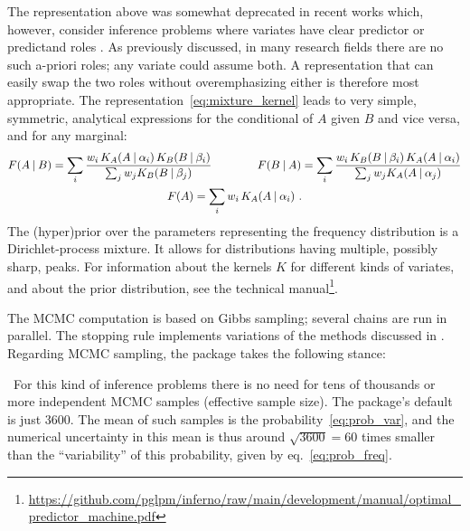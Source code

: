 The representation above was somewhat deprecated in recent works which, however, consider inference problems where variates have clear predictor or predictand roles \citep[e.g.][]{wadeetal2014,wadeetal2014b}. As previously discussed, in many research fields there are no such a-priori roles; any variate could assume both. A representation that can easily swap the two roles  without overemphasizing either is therefore most appropriate. The representation~\eqref{eq:mixture_kernel} leads to very simple, symmetric, analytical expressions for the conditional of $A$ given $B$ and vice versa, and for any marginal:
\begin{equation*}
  \begin{gathered}
    \yF(A \| B) = \sum_{i}
    \frac{w_{i}\, K_{A}(A \| \alpha_{i})\, K_{B}(B \| \beta_{i})}{\sum_{j} w_{j}K_{B}(B \| \beta_{j})}
\qquad\qquad    \yF(B \| A) = \sum_{i}
    \frac{w_{i}\, K_{B}(B \| \beta_{i})\, K_{A}(A \| \alpha_{i})}{\sum_{j} w_{j}K_{A}(A \| \alpha_{j})}
    \\
    \yF(A) = \sum_{i}
    w_{i}\, K_{A}(A \| \alpha_{i}) \ .
  \end{gathered}
\end{equation*}
The (hyper)prior over the parameters representing the frequency distribution is a Dirichlet-process mixture. It allows for distributions having multiple, possibly sharp, peaks. For information about the kernels $K$ for different kinds of variates, and about the prior distribution, see the technical manual\footnote{\url{https://github.com/pglpm/inferno/raw/main/development/manual/optimal_predictor_machine.pdf}}.

\smallskip

The MCMC computation is based on Gibbs sampling; several chains are run in parallel. The stopping rule implements variations of the methods discussed in \cite{vehtarietal2021}. Regarding MCMC sampling, the package takes the following stance:

\textbullet\ For this kind of inference problems there is no need for tens of thousands or more independent MCMC samples (effective sample size). The package's default is just 3600. The mean of such samples is the probability~\eqref{eq:prob_var}, and the numerical uncertainty in this mean is thus around $\sqrt{3600} = 60$ times smaller than the ``variability'' of this probability, given by eq.~\eqref{eq:prob_freq}.

